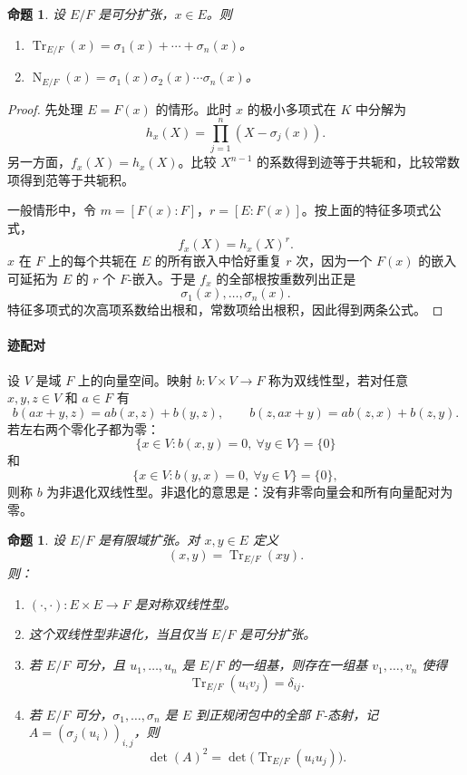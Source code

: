 \documentclass[11pt,a4paper,openany]{ctexbook}
\numberwithin{equation}{chapter}
\newcommand{\Tr}{\operatorname{Tr}}
\newcommand{\Nm}{\operatorname{N}}
\theoremstyle{plain}
\newtheorem{proposition}[theorem]{命题}
\theoremstyle{definition}
\theoremstyle{remark}
\begin{document}
\begin{proposition}
设 $E/F$ 是可分扩张，$x\in E$。则
\begin{enumerate}[label=(\arabic*)]
\item $\Tr_{E/F}(x)=\sigma_1(x)+\cdots+\sigma_n(x)$。
\item $\Nm_{E/F}(x)=\sigma_1(x)\sigma_2(x)\cdots\sigma_n(x)$。
\end{enumerate}
\end{proposition}

\begin{proof}
先处理 $E=F(x)$ 的情形。此时 $x$ 的极小多项式在 $K$ 中分解为
\[
h_x(X)=\prod_{j=1}^n (X-\sigma_j(x)).
\]
另一方面，$f_x(X)=h_x(X)$。比较 $X^{n-1}$ 的系数得到迹等于共轭和，比较常数项得到范等于共轭积。

一般情形中，令 $m=[F(x):F]$，$r=[E:F(x)]$。按上面的特征多项式公式，
\[
f_x(X)=h_x(X)^r.
\]
$x$ 在 $F$ 上的每个共轭在 $E$ 的所有嵌入中恰好重复 $r$ 次，因为一个 $F(x)$ 的嵌入可延拓为 $E$ 的 $r$ 个 $F$-嵌入。于是 $f_x$ 的全部根按重数列出正是
\[
\sigma_1(x),\dots,\sigma_n(x).
\]
特征多项式的次高项系数给出根和，常数项给出根积，因此得到两条公式。
\end{proof}

\paragraph{迹配对}
设 $V$ 是域 $F$ 上的向量空间。映射 $b:V\times V\to F$ 称为双线性型，若对任意 $x,y,z\in V$ 和 $a\in F$ 有
\[
b(ax+y,z)=ab(x,z)+b(y,z),\qquad
b(z,ax+y)=ab(z,x)+b(z,y).
\]
若左右两个零化子都为零：
\[
\{x\in V:b(x,y)=0,\ \forall y\in V\}=\{0\}
\]
和
\[
\{x\in V:b(y,x)=0,\ \forall y\in V\}=\{0\},
\]
则称 $b$ 为非退化双线性型。非退化的意思是：没有非零向量会和所有向量配对为零。

\begin{proposition}
设 $E/F$ 是有限域扩张。对 $x,y\in E$ 定义
\[
(x,y)=\Tr_{E/F}(xy).
\]
则：
\begin{enumerate}[label=(\arabic*)]
\item $(\cdot,\cdot):E\times E\to F$ 是对称双线性型。
\item 这个双线性型非退化，当且仅当 $E/F$ 是可分扩张。
\item 若 $E/F$ 可分，且 $u_1,\dots,u_n$ 是 $E/F$ 的一组基，则存在一组基 $v_1,\dots,v_n$ 使得
\[
\Tr_{E/F}(u_i v_j)=\delta_{ij}.
\]
\item 若 $E/F$ 可分，$\sigma_1,\dots,\sigma_n$ 是 $E$ 到正规闭包中的全部 $F$-态射，记 $A=(\sigma_j(u_i))_{i,j}$，则
\[
\det(A)^2=\det\bigl(\Tr_{E/F}(u_i u_j)\bigr).
\]
\end{enumerate}
\end{proposition}
\end{document}
